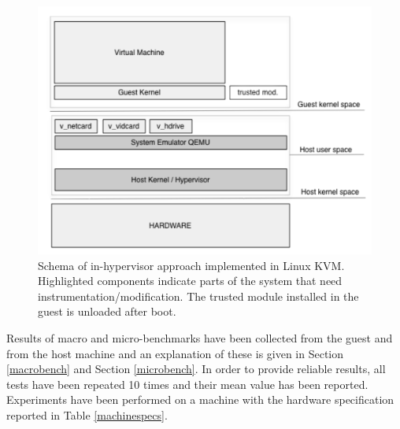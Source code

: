 \begin{figure}
\begin{center}
\includegraphics[scale=0.5]{images/hellorootkitty_schema.pdf}
\caption{Schema of in-hypervisor approach implemented in Linux KVM. Highlighted components indicate parts of the system that need instrumentation/modification. The trusted module installed in the guest is unloaded after boot.}
\label{hellorootkitty_schema}
\end{center}
\end{figure}


Results of macro and micro-benchmarks have been collected from the guest and from the host machine and an explanation of these is given in Section \ref{macrobench} and Section \ref{microbench}.
In order to provide reliable results, all tests have been repeated 10 times and their mean value has been reported. Experiments have been performed on a machine with the hardware specification reported in Table \ref{machinespecs}.

%


